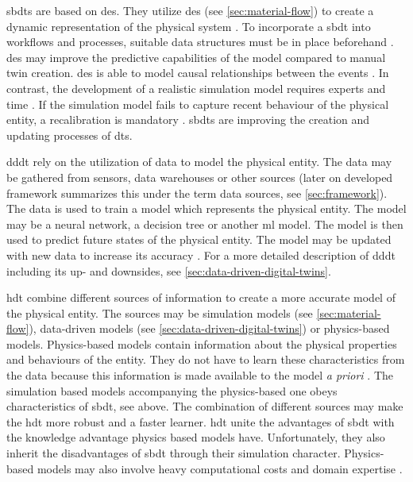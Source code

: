 \gls{sbdt}s \autocite{Lugaresi2021aifac,martinez2018automatic,boschert2016digital} are based on \gls{des}. They utilize \gls{des} (see \autoref{sec:material-flow}) to create a dynamic representation of the physical system \autocite{schluse2016simulation,pantelides2013online}. To incorporate a \gls{sbdt} into workflows and processes, suitable data structures must be in place beforehand \autocite{boschert2016digital}. \gls{des} may improve the predictive capabilities of the model compared to manual twin creation. \gls{des} is able to model causal relationships between the events \autocite{francis2021towards}. In contrast, the development of a realistic simulation model requires experts and time \autocite{Charpentier2014}. If the simulation model fails to capture recent behaviour of the physical entity, a recalibration is mandatory \autocite{Friederich2022}. \gls{sbdt}s are improving the creation and updating processes of \gls{dt}s.

\gls{dddt} rely on the utilization of data to model the physical entity. The data may be gathered from sensors, data warehouses or other sources (later on developed framework summarizes this under the term data sources, see \autoref{sec:framework}). The data is used to train a model which represents the physical entity. The model may be a neural network, a decision tree or another \gls{ml} model. The model is then used to predict future states of the physical entity. The model may be updated with new data to increase its accuracy \autocite{he2019data,Friederich2022}. For a more detailed description of \gls{dddt} including its up- and downsides, see \autoref{sec:data-driven-digital-twins}.

\gls{hdt} combine different sources of information to create a more accurate model of the physical entity. The sources may be simulation models (see \autoref{sec:material-flow}), data-driven models (see \autoref{sec:data-driven-digital-twins}) or physics-based models. Physics-based models contain information about the physical properties and behaviours of the entity. They do not have to learn these characteristics from the data because this information is made available to the model \textit{a priori} \autocite{kapteyn2022data,aivaliotis2019methodology}. The simulation based models accompanying the physics-based one obeys characteristics of \gls{sbdt}, see above. The combination of different sources may make the \gls{hdt} more robust and a faster learner. \gls{hdt} unite the advantages of \gls{sbdt} with the knowledge advantage physics based models have. Unfortunately, they also inherit the disadvantages of \gls{sbdt} through their simulation character. Physics-based models may also involve heavy computational costs and domain expertise \autocite{kapteyn2022data}.

